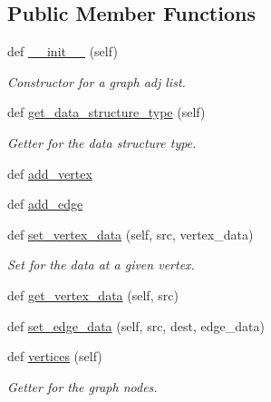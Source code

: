 \subsection*{Public Member Functions}
\begin{DoxyCompactItemize}
\item 
def \hyperlink{classbridges_1_1graph__adj__list_1_1_graph_adj_list_a8258a38ef234f4140b971e9fb7be7784}{\+\_\+\+\_\+init\+\_\+\+\_\+} (self)
\begin{DoxyCompactList}\small\item\em Constructor for a graph adj list. \end{DoxyCompactList}\item 
def \hyperlink{classbridges_1_1graph__adj__list_1_1_graph_adj_list_afe3d470247e6b64f38c0d5d51dece920}{get\+\_\+data\+\_\+structure\+\_\+type} (self)
\begin{DoxyCompactList}\small\item\em Getter for the data structure type. \end{DoxyCompactList}\item 
def \hyperlink{classbridges_1_1graph__adj__list_1_1_graph_adj_list_a61f1ad2a4f358a1e5137c189ba2b1de7}{add\+\_\+vertex}
\item 
def \hyperlink{classbridges_1_1graph__adj__list_1_1_graph_adj_list_a20a8e0801a34cce09ed429c58c1d851a}{add\+\_\+edge}
\item 
def \hyperlink{classbridges_1_1graph__adj__list_1_1_graph_adj_list_a7b4669b353a04f6868710c22790bd263}{set\+\_\+vertex\+\_\+data} (self, src, vertex\+\_\+data)
\begin{DoxyCompactList}\small\item\em Set for the data at a given vertex. \end{DoxyCompactList}\item 
def \hyperlink{classbridges_1_1graph__adj__list_1_1_graph_adj_list_a0523e2e842042c131dcbe4fd66a6a296}{get\+\_\+vertex\+\_\+data} (self, src)
\item 
def \hyperlink{classbridges_1_1graph__adj__list_1_1_graph_adj_list_aa1b179f2d1ded0135afa792278f3a500}{set\+\_\+edge\+\_\+data} (self, src, dest, edge\+\_\+data)
\item 
def \hyperlink{classbridges_1_1graph__adj__list_1_1_graph_adj_list_ae41cb9193582a782d4880b18085fc1c6}{vertices} (self)
\begin{DoxyCompactList}\small\item\em Getter for the graph nodes. \end{DoxyCompactList}\item 

\end{DoxyCompactItemize}
